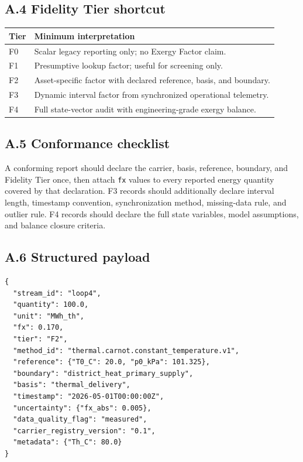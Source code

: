 \documentclass[11pt]{article}
\begin{document}
\subsection*{A.4 Fidelity Tier shortcut}

\begin{center}
\begin{tabularx}{0.92\linewidth}{@{}lX@{}}
\toprule
Tier & Minimum interpretation \\
\midrule
F0 & Scalar legacy reporting only; no Exergy Factor claim. \\
F1 & Presumptive lookup factor; useful for screening only. \\
F2 & Asset-specific factor with declared reference, basis, and boundary. \\
F3 & Dynamic interval factor from synchronized operational telemetry. \\
F4 & Full state-vector audit with engineering-grade exergy balance. \\
\bottomrule
\end{tabularx}
\end{center}

\subsection*{A.5 Conformance checklist}

A conforming report should declare the carrier, basis, reference, boundary, and Fidelity Tier once, then attach \texttt{fx} values to every reported energy quantity covered by that declaration. F3 records should additionally declare interval length, timestamp convention, synchronization method, missing-data rule, and outlier rule. F4 records should declare the full state variables, model assumptions, and balance closure criteria.

\subsection*{A.6 Structured payload}

\begin{verbatim}
{
  "stream_id": "loop4",
  "quantity": 100.0,
  "unit": "MWh_th",
  "fx": 0.170,
  "tier": "F2",
  "method_id": "thermal.carnot.constant_temperature.v1",
  "reference": {"T0_C": 20.0, "p0_kPa": 101.325},
  "boundary": "district_heat_primary_supply",
  "basis": "thermal_delivery",
  "timestamp": "2026-05-01T00:00:00Z",
  "uncertainty": {"fx_abs": 0.005},
  "data_quality_flag": "measured",
  "carrier_registry_version": "0.1",
  "metadata": {"Th_C": 80.0}
}
\end{verbatim}
\end{document}
